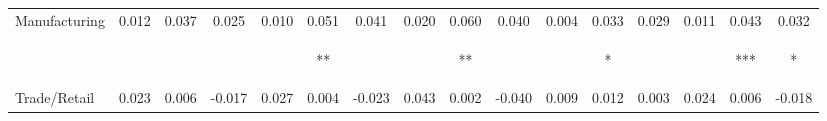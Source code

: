 \begin{tabular}{lccccccccccccccc}
\noalign{\smallskip}Manufacturing & 0.012 & 0.037 & 0.025 & 0.010 & 0.051 & 0.041 & 0.020 & 0.060 & 0.040 & 0.004 & 0.033 & 0.029 & 0.011 & 0.043 & 0.032\\
 & \begin{footnotesize}[0.016]\end{footnotesize} & \begin{footnotesize}[0.025]\end{footnotesize} & \begin{footnotesize}[0.026]\end{footnotesize} & \begin{footnotesize}[0.013]\end{footnotesize} & \begin{footnotesize}[0.025]**\end{footnotesize} & \begin{footnotesize}[0.028]\end{footnotesize} & \begin{footnotesize}[0.015]\end{footnotesize} & \begin{footnotesize}[0.024]**\end{footnotesize} & \begin{footnotesize}[0.030]\end{footnotesize} & \begin{footnotesize}[0.010]\end{footnotesize} & \begin{footnotesize}[0.017]*\end{footnotesize} & \begin{footnotesize}[0.020]\end{footnotesize} & \begin{footnotesize}[0.009]\end{footnotesize} & \begin{footnotesize}[0.014]***\end{footnotesize} & \begin{footnotesize}[0.017]*\end{footnotesize}\\
\noalign{\smallskip}Trade/Retail & 0.023 & 0.006 & -0.017 & 0.027 & 0.004 & -0.023 & 0.043 & 0.002 & -0.040 & 0.009 & 0.012 & 0.003 & 0.024 & 0.006 & -0.018\\

\end{tabular}
